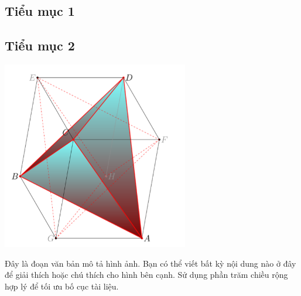 \subsection{Tiểu mục 1}

\subsection{Tiểu mục 2}

\noindent %
\begin{minipage}{0.4\textwidth} %
    \centering
    \includegraphics[width=\textwidth]{../../assets/images/figure-1.png} %
    \label{fig:image}
\end{minipage}%
\hfill %
\begin{minipage}{0.55\textwidth} %
    Đây là đoạn văn bản mô tả hình ảnh. Bạn có thể viết bất kỳ nội dung nào ở đây để giải thích hoặc chú thích cho hình bên cạnh. Sử dụng phần trăm chiều rộng hợp lý để tối ưu bố cục tài liệu.
\end{minipage}
